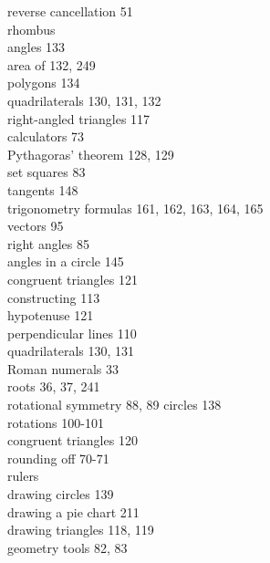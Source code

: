 \documentclass[10pt]{article}
\begin{document}
reverse cancellation 51\\
rhombus\\
angles 133\\
area of 132, 249\\
polygons 134\\
quadrilaterals 130, 131, 132\\
right-angled triangles 117\\
calculators 73\\
Pythagoras' theorem 128, 129\\
set squares 83\\
tangents 148\\
trigonometry formulas 161, 162, 163, 164, 165\\
vectors 95\\
right angles 85\\
angles in a circle 145\\
congruent triangles 121\\
constructing 113\\
hypotenuse 121\\
perpendicular lines 110\\
quadrilaterals 130, 131\\
Roman numerals 33\\
roots 36, 37, 241\\
rotational symmetry 88, 89 circles 138\\
rotations 100-101\\
congruent triangles 120\\
rounding off 70-71\\
rulers\\
drawing circles 139\\
drawing a pie chart 211\\
drawing triangles 118, 119\\
geometry tools 82, 83
\end{document}
